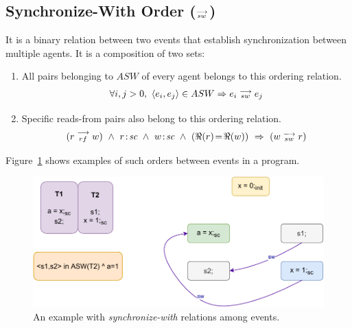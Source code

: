     \subsection{Synchronize-With Order ($\stackrel{\longrightarrow}{_{sw}} $)}
        It is a binary relation between two events that establish synchronization between multiple agents. 
        It is a composition of two sets: 
        \begin{enumerate}
            \item All pairs belonging to $ASW$ of every agent belongs to this ordering relation. 
                \begin{align*}
                    \forall{i, j > 0}, \ \langle e_i, e_j \rangle \in ASW \Rightarrow{} e_i\stackrel{\longrightarrow}{_{sw}}e_j 
                \end{align*}
                    
            \item Specific reads-from pairs also belong to this ordering relation\footnotemark. 
                \begin{align*}
                    (\reln{r}{rf}{w}) \ \wedge \ \et{r}{sc} \ \wedge \ \et{w}{sc} \ \wedge \ (\Re(r)\!=\!\Re(w)) \ \Rightarrow{} \
                    (\reln{w}{sw}{r})
                \end{align*}            
        \end{enumerate}
        Figure~\ref{model:sync-with} shows examples of such orders between events in a program. 
        \begin{figure}[H]
            \centering
            \includegraphics[scale=0.7]{3.ECMAScriptMemoryModel/SynchronizeWith.pdf}
            \caption{An example with \textit{synchronize-with} relations among events.}
            \label{model:sync-with}
        \end{figure}

        
